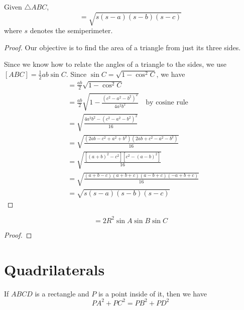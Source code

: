\begin{theorem}
Given $\triangle ABC$,
\begin{equation}
[ABC]=\sqrt{s(s-a)(s-b)(s-c)} 
\end{equation} 
where $s$ denotes the semiperimeter.
\end{theorem}

\begin{proof}
Our objective is to find the area of a triangle from just its three sides.

Since we know how to relate the angles of a triangle to the sides, we use $[ABC]=\frac{1}{2}ab\sin C$. Since $\sin C=\sqrt{1-\cos^2C}$, we have
\begin{align*}
[ABC] &= \frac{ab}{2}\sqrt{1-\cos^2C} \\
&= \frac{ab}{2}\sqrt{1-\frac{(c^2-a^2-b^2)^2}{4a^2b^2}} \quad \text{by cosine rule} \\
&= \sqrt{\frac{4a^2b^2-(c^2-a^2-b^2)^2}{16}} \\
&= \sqrt{\frac{(2ab-c^2+a^2+b^2)(2ab+c^2-a^2-b^2)}{16}} \\
&= \sqrt{\frac{[(a+b)^2-c^2][c^2-(a-b)^2]}{16}} \\
&= \sqrt{\frac{(a+b-c)(a+b+c)(a-b+c)(-a+b+c)}{16}} \\
&= \sqrt{s(s-a)(s-b)(s-c)}
\end{align*}
\end{proof}

\begin{equation}
[ABC]=2R^2\sin A\sin B\sin C
\end{equation}

\begin{proof}

\end{proof}

\section{Quadrilaterals}
\begin{theorem} 
If $ABCD$ is a rectangle and $P$ is a point inside of it, then we have 
\[ PA^2+PC^2=PB^2+PD^2 \] 
\end{theorem}

\begin{figure}[H]
    \centering
\end{figure}

